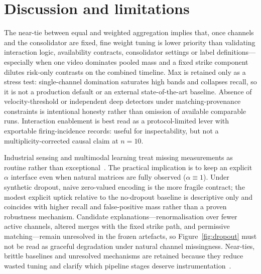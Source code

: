 \documentclass[preprint,12pt,numbers,sort&compress]{elsarticle}
\begin{document}
\section{Discussion and limitations}
\label{sec:discussion}
\label{sec:disc-dropout}
\label{sec:limitations}

The near-tie between equal and weighted aggregation implies that, once channels and the consolidator are fixed, fine weight tuning is lower priority than validating interaction logic, availability contracts, consolidator settings or label definitions---especially when one video dominates pooled mass and a fixed strike component dilutes risk-only contrasts on the combined timeline.
Max is retained only as a stress test: single-channel domination saturates high bands and collapses recall, so it is not a production default or an external state-of-the-art baseline.
Absence of velocity-threshold or independent deep detectors under matching-provenance constraints is intentional honesty rather than omission of available comparable runs.
Interaction enablement is best read as a protocol-limited lever with exportable firing-incidence records: useful for inspectability, but not a multiplicity-corrected causal claim at $n{=}10$.

Industrial sensing and multimodal learning treat missing measurements as routine rather than exceptional~\cite{emmanuel2021missing,teh2020sensorquality,ma2021smil}.
The practical implication is to keep an explicit $\alpha$ interface even when natural matrices are fully observed ($\alpha{\equiv}1$).
Under synthetic dropout, naive zero-valued encoding is the more fragile contract; the modest explicit uptick relative to the no-dropout baseline is descriptive only and coincides with higher recall and false-positive mass rather than a proven robustness mechanism.
Candidate explanations---renormalisation over fewer active channels, altered merges with the fixed strike path, and permissive matching---remain unresolved in the frozen artefacts, so Figure~\ref{fig:dropout} must not be read as graceful degradation under natural channel missingness.
Near-ties, brittle baselines and unresolved mechanisms are retained because they reduce wasted tuning and clarify which pipeline stages deserve instrumentation~\cite{lipton2018mythos,pineau2021reproducibility,kapoor2023leakage}.
\end{document}
